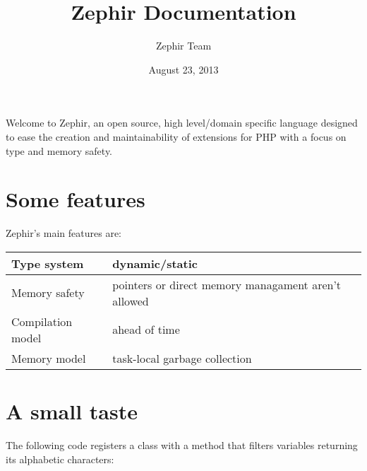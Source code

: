 \documentclass[letterpaper,10pt,english]{sphinxmanual}
\title{Zephir Documentation}
\date{August 23, 2013}
\author{Zephir Team}
\begin{document}
\maketitle
\tableofcontents
{}\label{index::doc}


Welcome to Zephir, an open source, high level/domain specific language
designed to ease the creation and maintainability of extensions for PHP
with a focus on type and memory safety.


\chapter{Some features}
\label{index:welcome}\label{index:some-features}
Zephir's main features are:

\begin{tabulary}{\linewidth}{|L|L|}
\hline

Type system
 & 
dynamic/static
\\\hline

Memory safety
 & 
pointers or direct memory managament aren't allowed
\\\hline

Compilation model
 & 
ahead of time
\\\hline

Memory model
 & 
task-local garbage collection
\\\hline
\end{tabulary}



\chapter{A small taste}
\label{index:a-small-taste}
The following code registers a class with a method that filters variables returning its
alphabetic characters:
\end{document}
